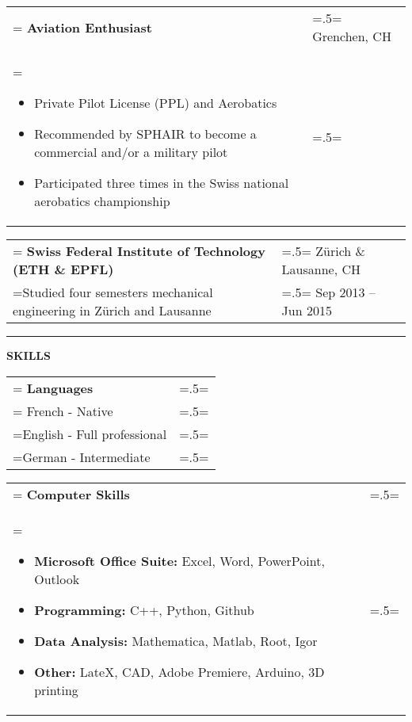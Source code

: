 \documentclass[letterpaper, 11pt]{article}
\begin{document}
\begin{tabularx}{1.0\textwidth} { 
   >{\raggedright\arraybackslash\hsize=1.5\hsize\linewidth=\hsize}X 
   >{\raggedleft\arraybackslash\hsize=.5\hsize\linewidth=\hsize}X }
\normalsize
\bf{Aviation Enthusiast} & Grenchen, CH\\
\normalfont \begin{itemize}[leftmargin=*,noitemsep,topsep=0pt]
\item Private Pilot License (PPL) and Aerobatics
\item Recommended by SPHAIR to become a commercial and/or a military pilot
\item Participated three times in the Swiss national aerobatics championship
\end{itemize} & 2014
\end{tabularx}

\begin{tabularx}{1.0\textwidth} { 
   >{\raggedright\arraybackslash\hsize=1.5\hsize\linewidth=\hsize}X 
   >{\raggedleft\arraybackslash\hsize=.5\hsize\linewidth=\hsize}X }
\normalsize
\bf{Swiss Federal Institute of Technology (ETH \& EPFL)} & Zürich \& Lausanne, CH \\
\normalfont Studied four semesters mechanical engineering in Zürich and Lausanne & Sep 2013 -- Jun 2015
\end{tabularx}

\begin{center}
\noindent\rule{0.75\textwidth}{1pt}
\end{center}

\begin{center}
\large\bf{SKILLS}
\end{center}

\begin{tabularx}{1.0\textwidth} { 
   >{\raggedright\arraybackslash\hsize=1.5\hsize\linewidth=\hsize}X 
   >{\raggedleft\arraybackslash\hsize=.5\hsize\linewidth=\hsize}X }
\normalsize
\bf{Languages} & \\
\normalfont
French - Native & \\
English - Full professional & \\
German - Intermediate 
\end{tabularx}
\vspace{0.25cm}

\begin{tabularx}{1.0\textwidth} { 
   >{\raggedright\arraybackslash\hsize=1.5\hsize\linewidth=\hsize}X 
   >{\raggedleft\arraybackslash\hsize=.5\hsize\linewidth=\hsize}X }
\normalsize
\bf{Computer Skills} & \\
\normalfont \begin{itemize}[leftmargin=*,noitemsep,topsep=0pt]
\item \textbf{Microsoft Office Suite:}  Excel, Word, PowerPoint, Outlook
\item \textbf{Programming:} C++, Python, Github
\item \textbf{Data Analysis:} Mathematica, Matlab, Root, Igor
\item \textbf{Other:} LateX, CAD, Adobe Premiere, Arduino, 3D printing
\end{itemize} & 
\end{tabularx}
\end{document}
